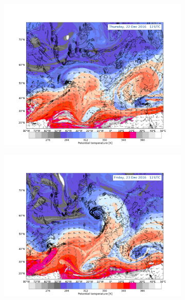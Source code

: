 \begin{figure}[t!]
	\begin{subfigure}[b]{0.49\textwidth}
		\includegraphics[trim={4.2cm 3.9cm 4.3cm 5.1cm},clip,
		width=\textwidth]{./fig_DynTropo/20161222_12}
		\caption{}\label{fig:DT22}
	\end{subfigure}
	\begin{subfigure}[b]{0.49\textwidth}
		\includegraphics[trim={4.2cm 3.9cm 4.3cm 5.1cm},clip,
		width=\textwidth]{./fig_DynTropo/20161223_12}
		\caption{}\label{fig:DT23}
	\end{subfigure}
	

\end{figure}
